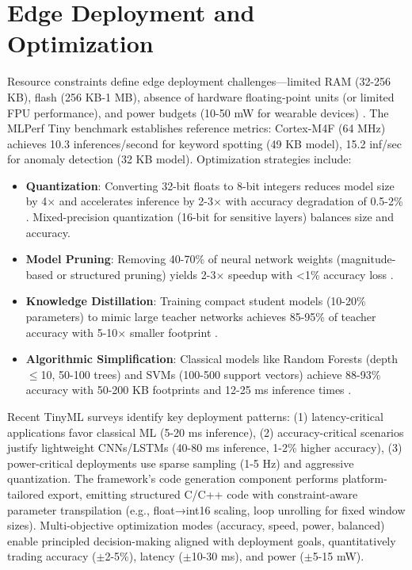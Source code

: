 \section{Edge Deployment and Optimization}
Resource constraints define edge deployment challenges---limited RAM (32-256 KB), flash (256 KB-1 MB), absence of hardware floating-point units (or limited FPU performance), and power budgets (10-50 mW for wearable devices) \cite{banbury2021mlperf, ray2023tinyml_survey}. The MLPerf Tiny benchmark \cite{banbury2021mlperf} establishes reference metrics: Cortex-M4F (64 MHz) achieves 10.3 inferences/second for keyword spotting (49 KB model), 15.2 inf/sec for anomaly detection (32 KB model). Optimization strategies include:
\begin{itemize}
    \item \textbf{Quantization}: Converting 32-bit floats to 8-bit integers reduces model size by 4$\times$ and accelerates inference by 2-3$\times$ with accuracy degradation of 0.5-2\% \cite{lin2022mcunet}. Mixed-precision quantization (16-bit for sensitive layers) balances size and accuracy.
    \item \textbf{Model Pruning}: Removing 40-70\% of neural network weights (magnitude-based or structured pruning) yields 2-3$\times$ speedup with <1\% accuracy loss \cite{schmidhuber2015deep}.
    \item \textbf{Knowledge Distillation}: Training compact student models (10-20\% parameters) to mimic large teacher networks achieves 85-95\% of teacher accuracy with 5-10$\times$ smaller footprint \cite{dutta2023tinyml_platforms}.
    \item \textbf{Algorithmic Simplification}: Classical models like Random Forests (depth $\leq$10, 50-100 trees) and SVMs (100-500 support vectors) achieve 88-93\% accuracy with 50-200 KB footprints and 12-25 ms inference times \cite{wang2024har_comparative}.
\end{itemize}
Recent TinyML surveys \cite{ray2023tinyml_survey, dutta2023tinyml_platforms} identify key deployment patterns: (1) latency-critical applications favor classical ML (5-20 ms inference), (2) accuracy-critical scenarios justify lightweight CNNs/LSTMs (40-80 ms inference, 1-2\% higher accuracy), (3) power-critical deployments use sparse sampling (1-5 Hz) and aggressive quantization. The framework's code generation component performs platform-tailored export, emitting structured C/C++ code with constraint-aware parameter transpilation (e.g., float→int16 scaling, loop unrolling for fixed window sizes). Multi-objective optimization modes (accuracy, speed, power, balanced) enable principled decision-making aligned with deployment goals, quantitatively trading accuracy ($\pm$2-5\%), latency ($\pm$10-30 ms), and power ($\pm$5-15 mW).


